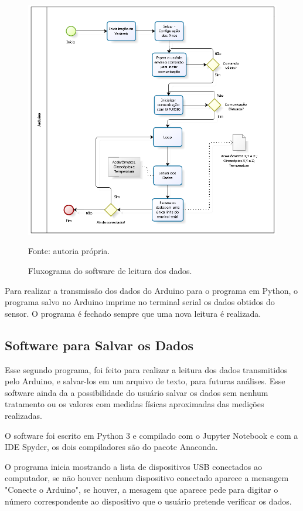 		\begin{figure}[h]
			\centering
			\includegraphics[keepaspectratio=true,scale=0.8]{figuras/diagrama_embarcado.PNG}
			\caption{Fluxograma do software de leitura dos dados. }
			Fonte: autoria própria. 
			\label{fluxograma_arduino}	
		\end{figure}
		
		Para realizar a transmissão dos dados do Arduino para o programa em Python, o programa salvo no Arduino imprime no terminal serial os dados obtidos do sensor. O programa é fechado sempre que uma nova leitura é realizada.
		 
\subsection{Software para Salvar os Dados}
		Esse segundo programa, foi feito para realizar a leitura dos dados transmitidos pelo Arduino, e salvar-los em um arquivo de texto, para futuras análises. Esse software ainda da a possibilidade do usuário salvar os dados sem nenhum tratamento ou os valores com medidas físicas aproximadas das medições realizadas. 
		
		O software foi escrito em Python 3 e compilado com o Jupyter Notebook e com a IDE Spyder, os dois compiladores são do pacote Anaconda. 
		
		O programa inicia mostrando a lista de dispositivos USB conectados ao computador, se não houver nenhum dispositivo conectado aparece a mensagem "Conecte o Arduino", se houver, a mesagem que aparece pede para digitar o número correspondente ao dispositivo que o usuário pretende verificar os dados. 
		
